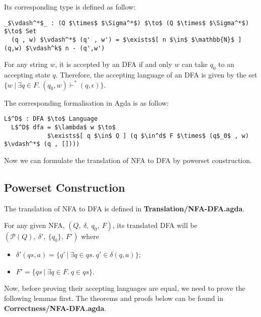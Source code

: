 \par Its corresponding type is defined as follow: 
\begin{lstlisting}[mathescape=true,xleftmargin=.3\textwidth]
  _$\vdash^*$_ : (Q $\times$ $\Sigma^*$) $\to$ (Q $\times$ $\Sigma^*$) $\to$ Set
  (q , w) $\vdash^*$ (q' , w') = $\exists$[ n $\in$ $\mathbb{N}$ ] (q,w) $\vdash^k$ n - (q',w')
\end{lstlisting}

\begin{defn}
\noindent For any string \(w\), it is accepted by an DFA
if and only \(w\) can take \(q_0\) to an accepting state \(q\). Therefore, the
accepting language of an DFA is given by the set \(\{w\ |\ \exists q\in F.\ (q_0,w) \vdash^* (q,\epsilon)\}\). 
\end{defn}

\par The corresponding formalisation in Agda is as follow: 
\begin{lstlisting}[mathescape=true,xleftmargin=.3\textwidth]
  L$^D$ : DFA $\to$ Language
  L$^D$ dfa = $\lambda$ w $\to$ 
            $\exists$[ q $\in$ Q ] (q $\in^d$ F $\times$ (q$_0$ , w) $\vdash^*$ (q , [])))
\end{lstlisting} 

\par Now we can formulate the translation of NFA to DFA
by powerset construction. 


\subsection{Powerset Construction}
\par The translation of NFA to DFA is defined in
\textbf{Translation/NFA-DFA.agda}. 

\begin{defn}
\label{defn:powerset}
\noindent For any given NFA, \((Q,\ \delta,\ q_0,\ F)\), its
translated DFA will be \((\mathcal P \left({Q}\right),\ \delta',\ \{q_0\},\ F')\) where
\begin{itemize}[nolistsep]
  \item \(\delta'(qs,a) = \{q'\ |\ \exists q\in qs.\ q' \in \delta (q,a)\}\);
  \item \(F' = \{qs\ |\ \exists q\in F.\ q \in qs\}\). 
\end{itemize}
\end{defn}

\par Now, before proving their accepting languages are equal, we 
need to prove the following lemmas first. The theorems and proofs below can be found in
\textbf{Correctness/NFA-DFA.agda}. 

